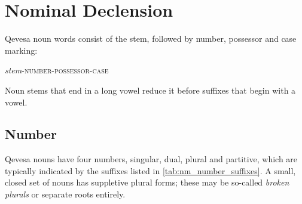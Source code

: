 \documentclass[grammar]{subfiles}
\begin{document}








\section{Nominal Declension}
\label{sec:nm_declension}

Qevesa noun words consist of the stem, followed by number, possessor and case marking:

\begin{exe}
  \ex\label{ex:nm_structure} \textit{stem}\textsc{-number-possessor-case}
\end{exe}

Noun stems that end in a long vowel reduce it before suffixes that begin with a vowel. 


\subsection{Number}
\label{ssec:nm_number}

Qevesa nouns have four numbers, singular, dual, plural and partitive, which are
typically indicated by the suffixes listed in \cref{tab:nm_number_suffixes}.  A
small, closed set of nouns has suppletive plural forms; these may be so-called 
\emph{broken plurals} or separate roots entirely. 
\end{document}
